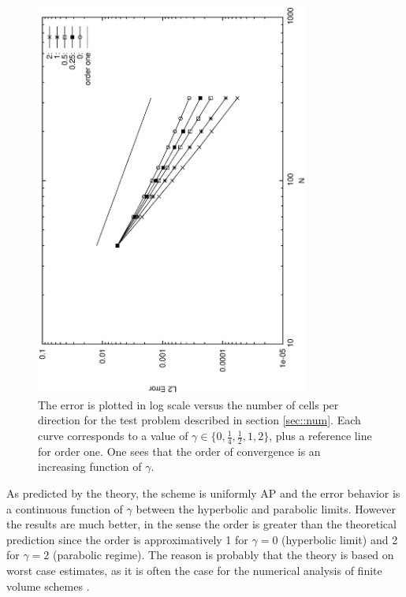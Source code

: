 \documentclass[a4paper,french,english,10pt]{article}
\begin{document}
\begin{figure}
\begin{center}
\includegraphics[width=9cm,angle=-90]{sortie_enfin.eps}
\end{center}
\caption{The error is plotted in log scale versus the number of cells per direction for the test problem described
in section \ref{sec::num}.
Each curve corresponds to a value of $\gamma\in\{0,\frac14, \frac12, 1, 2  \}$, plus 
a reference line for order one. One sees that the order of convergence is an increasing function
of $\gamma$.}
\label{fig1}
\end{figure}

As predicted by  the theory, the scheme is uniformly AP and the error behavior is a continuous function of $\gamma$
between the  hyperbolic and parabolic limits. However the results are much better, in the sense
the order is greater than the theoretical prediction since
the order is approximatively 1 for $\gamma=0$ (hyperbolic limit)
and 2 for $\gamma=2$ (parabolic regime).
The reason is probably that the theory is based on worst case estimates, as it is often the case for the numerical analysis
of finite volume schemes \cite{FV}.


\end{document}
